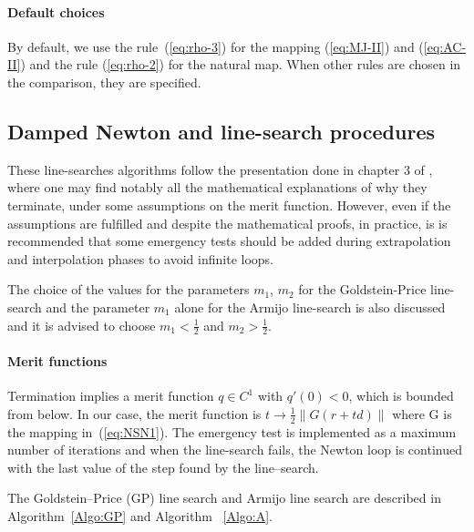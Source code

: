 \paragraph{Default choices} By default, we use the rule~(\ref{eq:rho-3}) for the mapping  (\ref{eq:MJ-II}) and (\ref{eq:AC-II}) and the rule  (\ref{eq:rho-2}) for the natural map. When other rules are chosen in the comparison, they are specified.


\subsection{Damped Newton and line-search procedures}

These line-searches algorithms follow the presentation done in chapter 3 of
\cite{Bonnans.ea2003}, where one may find notably all the mathematical
explanations of why they terminate, under some assumptions on the merit
function. However, even if the assumptions are fulfilled and despite the
mathematical proofs, in practice, is is recommended that some emergency tests
should be added during extrapolation and interpolation phases to avoid
infinite loops.

The choice of the values for the parameters $m_1$, $m_2$ for the
Goldstein-Price line-search and the parameter $m_1$ alone for the Armijo
line-search is also discussed and it is advised to choose $m_1 < \frac{1}{2}$
and $m_2 > \frac{1}{2}$.
\paragraph{Merit functions}

Termination implies a merit function $q \in C^1$ with $q'(0) < 0$, which is
bounded from below. In our case, the merit function is
$t \to \frac{1}{2} \|G(r + t d)\|$ where G is the mapping in~(\ref{eq:NSN1}). The
emergency test is implemented as a maximum number of iterations and when the
line-search fails, the Newton loop is continued with the last value of the step found by the line--search.

The Goldstein--Price (GP) line search and Armijo line search are described in Algorithm~\ref{Algo:GP} and Algorithm ~\ref{Algo:A}.



